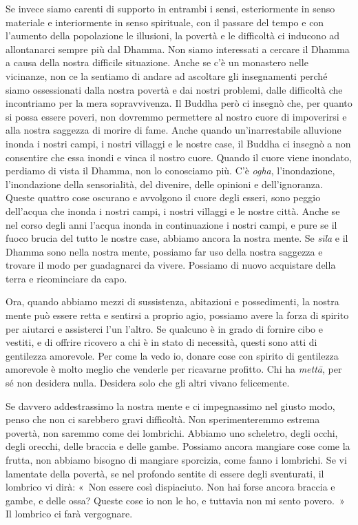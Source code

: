 Se invece siamo carenti di supporto in entrambi i sensi, esteriormente
in senso materiale e interiormente in senso spirituale, con il passare
del tempo e con l'aumento della popolazione le illusioni, la povertà e
le difficoltà ci inducono ad allontanarci sempre più dal Dhamma. Non
siamo interessati a cercare il Dhamma a causa della nostra difficile
situazione. Anche se c'è un monastero nelle vicinanze, non ce la
sentiamo di andare ad ascoltare gli insegnamenti perché siamo
ossessionati dalla nostra povertà e dai nostri problemi, dalle
difficoltà che incontriamo per la mera sopravvivenza. Il Buddha però ci
insegnò che, per quanto si possa essere poveri, non dovremmo permettere
al nostro cuore di impoverirsi e alla nostra saggezza di morire di fame.
Anche quando un'inarrestabile alluvione inonda i nostri campi, i nostri
villaggi e le nostre case, il Buddha ci insegnò a non consentire che
essa inondi e vinca il nostro cuore. Quando il cuore viene inondato,
perdiamo di vista il Dhamma, non lo conosciamo più. C'è \emph{ogha},
l'inondazione, l'inondazione della sensorialità, del divenire, delle
opinioni e dell'ignoranza. Queste quattro cose oscurano e avvolgono il
cuore degli esseri, sono peggio dell'acqua che inonda i nostri campi, i
nostri villaggi e le nostre città. Anche se nel corso degli anni l'acqua
inonda in continuazione i nostri campi, e pure se il fuoco brucia del
tutto le nostre case, abbiamo ancora la nostra mente. Se \emph{sīla} e
il Dhamma sono nella nostra mente, possiamo far uso della nostra
saggezza e trovare il modo per guadagnarci da vivere. Possiamo di nuovo
acquistare della terra e ricominciare da capo.

Ora, quando abbiamo mezzi di sussistenza, abitazioni e possedimenti, la
nostra mente può essere retta e sentirsi a proprio agio, possiamo avere
la forza di spirito per aiutarci e assisterci l'un l'altro. Se qualcuno
è in grado di fornire cibo e vestiti, e di offrire ricovero a chi è in
stato di necessità, questi sono atti di gentilezza amorevole. Per come
la vedo io, donare cose con spirito di gentilezza amorevole è molto
meglio che venderle per ricavarne profitto. Chi ha \emph{mettā}, per sé
non desidera nulla. Desidera solo che gli altri vivano felicemente.

Se davvero addestrassimo la nostra mente e ci impegnassimo nel giusto
modo, penso che non ci sarebbero gravi difficoltà. Non sperimenteremmo
estrema povertà, non saremmo come dei lombrichi. Abbiamo uno scheletro,
degli occhi, degli orecchi, delle braccia e delle gambe. Possiamo ancora
\mbox{mangiare} cose come la frutta, non abbiamo bisogno di mangiare sporcizia,
come fanno i lombrichi. Se vi lamentate della povertà, se nel profondo
sentite di essere degli sventurati, il lombrico vi dirà: «~Non essere
così dispiaciuto. Non hai forse ancora braccia e gambe, e delle ossa?
Queste cose io non le ho, e tuttavia non mi sento povero.~» Il lombrico
ci farà vergognare.

